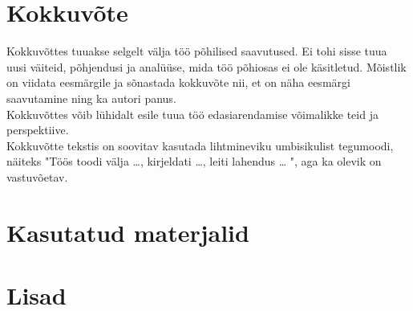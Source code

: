 \documentclass[12pt]{report}
\begin{document}
  \newpage
  
  \section*{Kokkuvõte}
  \label{kokkuvote}

Kokkuvõttes tuuakse selgelt välja töö põhilised saavutused. Ei tohi sisse tuua uusi väiteid, põhjendusi ja analüüse, mida töö põhiosas ei ole käsitletud. Mõistlik on viidata eesmärgile ja sõnastada kokkuvõte nii, et on näha eesmärgi saavutamine ning ka autori panus.\\

Kokkuvõttes võib lühidalt esile tuua töö edasiarendamise võimalikke teid ja perspektiive.\\

Kokkuvõtte tekstis on soovitav kasutada lihtmineviku umbisikulist tegumoodi, näiteks "Töös toodi välja …, kirjeldati …, leiti lahendus … ", aga ka olevik on vastuvõetav.

  \newpage
  
  \section*{Kasutatud materjalid}
  \label{kasutatud-materjalid}

  \newpage
  
  \section*{Lisad}
  \label{lisad}
\end{document}
